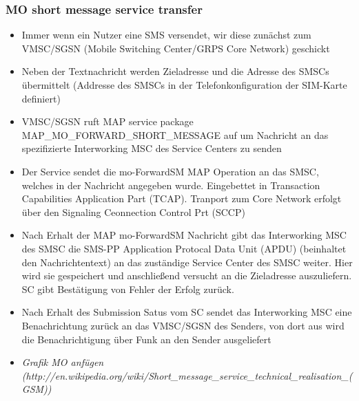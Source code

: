 \documentclass[german,12pt,a4paper]{article}
\begin{document}
\subsubsection{MO short message service transfer}
\begin{itemize}
	\item Immer wenn ein Nutzer eine SMS versendet, wir diese zunächst zum 
		VMSC/SGSN (Mobile Switching Center/GRPS Core Network) geschickt
	\item Neben der Textnachricht werden Zieladresse und die Adresse des 
		SMSCs übermittelt (Addresse des SMSCs in der Telefonkonfiguration der SIM-Karte 
		definiert)
	\item VMSC/SGSN ruft MAP service package MAP\_MO\_FORWARD\_SHORT\_MESSAGE auf um 
		Nachricht an das spezifizierte Interworking MSC des Service Centers zu senden
	\item Der Service sendet die mo-ForwardSM MAP Operation an das SMSC, welches 
		in der Nachricht angegeben wurde. Eingebettet in Transaction Capabilities Application
		Part (TCAP). Tranport zum Core Network erfolgt über den Signaling Ceonnection 
		Control Prt (SCCP)
	\item Nach Erhalt der MAP mo-ForwardSM Nachricht gibt das Interworking MSC des SMSC die 
		SMS-PP Application Protocal Data Unit (APDU) (beinhaltet den Nachrichtentext) an 
		das zuständige Service Center des SMSC weiter. Hier wird sie gespeichert und 
		anschließend versucht an die Zieladresse auszuliefern. SC gibt Bestätigung von 
		Fehler der Erfolg zurück.
	\item Nach Erhalt des Submission Satus vom SC sendet das Interworking MSC eine 
		Benachrichtung zurück an das VMSC/SGSN des Senders, von dort aus wird die 
		Benachrichtigung über Funk an den Sender ausgeliefert
	\item \textit{Grafik MO anfügen \\(http://en.wikipedia.org/wiki/Short\_message\_service\_technical\_realisation\_(GSM))}
\end{itemize}
\end{document}
